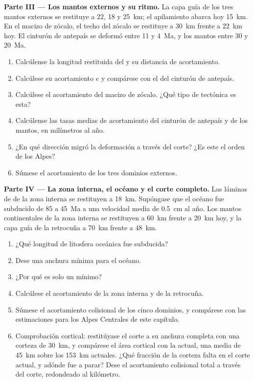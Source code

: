 \begin{problem}
\noindent\textbf{Parte III --- Los mantos externos y su ritmo.} La capa guía de los
tres mantos externos se restituye a 22, 18 y \qty{25}{km}; el apilamiento abarca hoy
\qty{15}{km}. En el macizo de zócalo, el techo del zócalo se restituye a \qty{30}{km}
frente a \qty{22}{km} hoy. El cinturón de antepaís se deformó entre 11 y \qty{4}{Ma}, y los
mantos entre 30 y \qty{20}{Ma}.
\begin{enumerate}[resume]
\item Calcúlense la longitud restituida del  y su distancia de acortamiento.
\item Calcúlese su acortamiento $e$ y compárese con el del cinturón de antepaís.
\item Calcúlese el acortamiento del macizo de zócalo. ¿Qué tipo de tectónica es esta?
\item Calcúlense las tasas medias de acortamiento del cinturón de antepaís y de los mantos, en
milímetros al año.
\item ¿En qué dirección migró la deformación a través del corte? ¿Es este el orden
de los Alpes?
\item Súmese el acortamiento de los tres dominios externos.
\end{enumerate}

\noindent\textbf{Parte IV --- La zona interna, el océano y el corte completo.}
Las láminas de  de la zona interna se restituyen a \qty{18}{km}. Supóngase que el océano fue
subducido de 85 a \qty{45}{Ma} a una velocidad media de \qty{0.5}{cm} al año. Los mantos
continentales de la zona interna se restituyen a \qty{60}{km} frente a \qty{20}{km} hoy, y la
capa guía de la retrocuña a \qty{70}{km} frente a \qty{48}{km}.
\begin{enumerate}[resume]
\item ¿Qué longitud de litosfera oceánica fue subducida?
\item Dese una anchura mínima para el océano.
\item ¿Por qué es solo un mínimo?
\item Calcúlese el acortamiento de la zona interna y de la retrocuña.
\item Súmese el acortamiento colisional de los cinco dominios, y compárese con las
estimaciones para los Alpes Centrales de este capítulo.
\item Comprobación cortical: restitúyase el corte a su anchura completa con una corteza de \qty{30}{km}, y
compárese el área cortical con la actual, una media de \qty{45}{km} sobre los
\qty{153}{km} actuales. ¿Qué fracción de la corteza falta en el corte actual, y adónde
fue a parar? Dese el acortamiento colisional total a través del corte, redondeado al
kilómetro.
\end{enumerate}
\end{problem}

